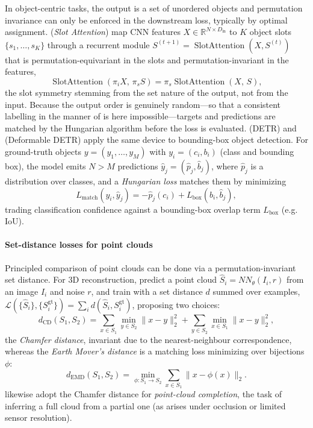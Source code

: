 \documentclass[mathematics,review,submit,moreauthors]{Definitions/mdpi}
\begin{document}
In object-centric tasks, the output is a set of unordered objects and permutation invariance can only be enforced in the downstream loss, typically by optimal assignment.
\citet{locatello2020anips} (\emph{Slot Attention}) map CNN features $X\in\mathbb{R}^{N\times D_{\mathrm{in}}}$ to $K$ object slots $\{s_1,\dots,s_K\}$ through a recurrent module $S^{(t+1)}=\operatorname{SlotAttention}(X,S^{(t)})$ that is permutation-equivariant in the slots and permutation-invariant in the features,
$$
\operatorname{SlotAttention}(\pi_i X,\, \pi_s S) = \pi_s \operatorname{SlotAttention}(X,\, S),
$$
the slot symmetry stemming from the set nature of the output, not from the input.
Because the output order is genuinely random---so that a consistent labelling in the manner of \citet{caron2020anips} is here impossible---targets and predictions are matched by the Hungarian algorithm before the loss is evaluated.
\citet{carion2020cv-e2} (DETR) and \citet{zhu2021} (Deformable DETR) apply the same device to bounding-box object detection.
For ground-truth objects $y=(y_1,\dots,y_M)$ with $y_i=(c_i,b_i)$ (class and bounding box), the model emits $N>M$ predictions $\hat y_j=(\hat p_j,\hat b_j)$, where $\hat p_j$ is a distribution over classes, and a \emph{Hungarian loss} matches them by minimizing
$$
L_{\mathrm{match}}(y_i,\hat y_j) = -\hat p_j(c_i) + L_{\mathrm{box}}(b_i,\hat b_j),
$$
trading classification confidence against a bounding-box overlap term $L_{\mathrm{box}}$ (e.g. IoU).

\paragraph{Set-distance losses for point clouds}
Principled comparison of point clouds can be done via a permutation-invariant set distance.
For 3D reconstruction, \citet{fan2017} predict a point cloud $\hat S_i = NN_\theta(I_i, r)$ from an image $I_i$ and noise $r$, and train with a set distance $d$ summed over examples, $\mathcal{L}(\{\hat S_i\},\{S_i^{\mathrm{gt}}\})=\sum_i d(\hat S_i, S_i^{\mathrm{gt}})$, proposing two choices:
$$
d_{\mathrm{CD}}(S_1,S_2) = \sum_{x\in S_1}\min_{y\in S_2}\|x-y\|_2^2 + \sum_{y\in S_2}\min_{x\in S_1}\|x-y\|_2^2,
$$
the \emph{Chamfer distance}, invariant due to the nearest-neighbour correspondence, whereas the \emph{Earth Mover's distance} is a matching loss minimizing over bijections $\phi$:
$$
d_{\mathrm{EMD}}(S_1,S_2) = \min_{\phi:S_1\to S_2}\sum_{x\in S_1}\|x-\phi(x)\|_2 .
$$
\citet{lin2023} likewise adopt the Chamfer distance for \emph{point-cloud completion}, the task of inferring a full cloud from a partial one (as arises under occlusion or limited sensor resolution).
\end{document}
